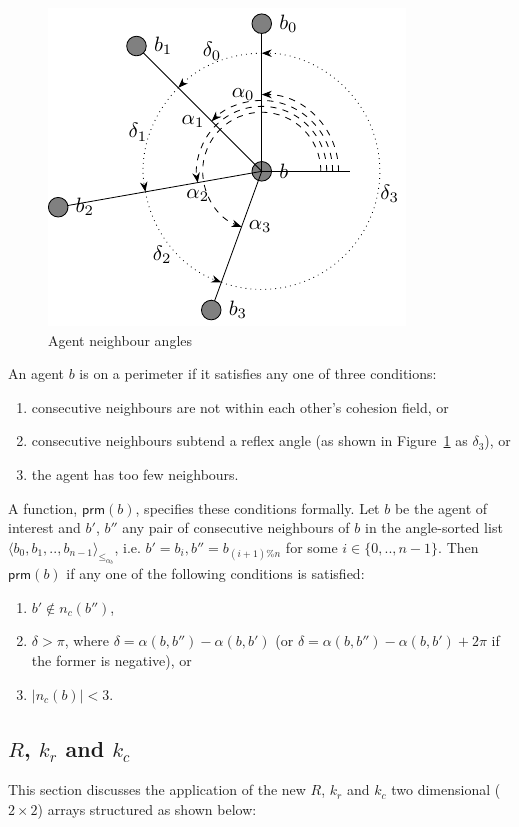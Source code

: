 \documentclass[12pt,a4paper]{IEEEtran}
\newcommand{\card}[1]{\vert{#1}\vert}
\newcommand{\pangle}{\mathit{\alpha}}
\newcommand{\leqaz}[3]{#2 \leq_{\pangle_#1} #3}
\newcommand{\angleordered}[2]{\langle #2 \rangle_{\leqaz{#1}{}{}}}
\newcommand{\prm}{\mathsf{prm}}
\newcommand{\kc}{\mathit{k_c}}
\newcommand{\kr}{\mathit{k_r}}
\newcommand{\rb}{\mathit{R}}
\begin{document}
\begin{figure}[H]
	\centering
	\includegraphics[width=0.8\linewidth]{figures/neighbours3}
	\caption[Agent neighbours]{Agent neighbour angles}
	\label{fig:neighbours3}
\end{figure}

An agent $b$ is on a perimeter if it satisfies any one of three conditions:
\begin{enumerate}
	\item consecutive neighbours are not within each other's cohesion field, or
	\item consecutive neighbours subtend a reflex angle (as shown in Figure~\ref{fig:neighbours3} as $\delta_3$), or
	\item the agent has too few neighbours.
\end{enumerate}
A function, $\prm(b)$, specifies these conditions formally. Let $b$ be the
agent of interest and $b'$, $b''$ any pair of consecutive neighbours of $b$ in
the angle-sorted list $\angleordered{b}{b_0, b_1, .., b_{n-1}}$, i.e. $b' =
b_i, b'' = b_{(i+1)\%n}$ for some $i \in \{0,..,n-1\}$.  Then $\prm(b)$ if any
one of the following conditions is satisfied:
\begin{enumerate}
\item $b' \notin n_c(b'')$,
\item $\delta > \pi$, where $\delta = \pangle(b, b'') - \pangle(b, b')$ (or $\delta = \pangle(b, b'') - \pangle(b, b') + 2\pi$ if the former is negative), or
\item $\card{n_c(b)} < 3$.
\end{enumerate}

\subsection{$\rb$, $\kr$ and $\kc$}\label{sec:rbkrkc} 
This section discusses the application of the new $\rb$, $\kr$ and $\kc$ two dimensional ($2\times2$) arrays structured as shown below:
\end{document}
